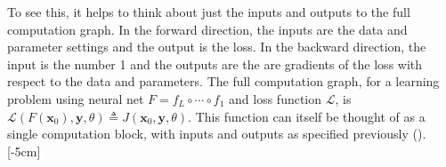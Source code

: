 To see this, it helps to think about just the inputs and outputs to the full computation graph. In the forward direction, the inputs are the data and parameter settings and the output is the loss. In the backward direction, the input is the number 1 and the outputs are the are gradients of the loss with respect to the data and parameters. The full computation graph, for a learning problem using neural net $F = f_L \circ \cdots \circ f_1$ and loss function $\mathcal{L}$, is $\mathcal{L}(F(\mathbf{x}_0), \mathbf{y}, \theta) \triangleq J(\mathbf{x}_0, \mathbf{y}, \theta)$. This function can itself be thought of as a single computation block, with inputs and outputs as specified previously (\fig{\ref{fig:backpropagation:J_forward_backward_blocks}}).
[-5cm]
